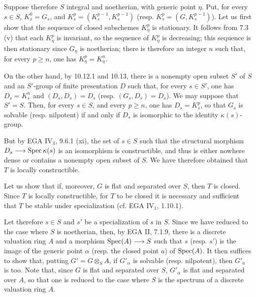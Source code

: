 Suppose therefore $S$ integral and noetherian, with generic point $\eta$. Put, for every $s\in S$, $K_s^0=G_s$, and $K_s^p=(K_s^{p-1},K_s^{p-1})$ (resp. $K_s^p=(G,K_s^{p-1})$). Let us first show that the sequence of closed subschemes $K_\eta^p$ is stationary. It follows from 7.3 (v) that each $K_\eta^p$ is invariant, so the sequence of $K_\eta^p$ is decreasing; this sequence is then stationary since $G_\eta$ is noetherian; there is therefore an integer $n$ such that, for every $p\geq n$, one has $K_\eta^p=K_\eta^n$.

On the other hand, by 10.12.1 and 10.13, there is a nonempty open subset $S'$ of $S$ and an $S'$-group of finite presentation $D$ such that, for every $s\in S'$, one has $D_s=K_s^n$ and $(D_s,D_s)=D_s$ (resp. $(G_s,D_s)=D_s$). We may suppose that $S'=S$. Then, for every $s\in S$, and every $p\geq n$, one has $D_s=K_s^p$, so that $G_s$ is solvable (resp. nilpotent) if and only if $D_s$ is isomorphic to the identity $\kappa(s)$-group.

But by EGA IV$_3$, 9.6.1 (xi), the set of $s\in S$ such that the structural morphism $D_s\longrightarrow\operatorname{Spec}\kappa(s)$ is an isomorphism is constructible, and thus is either nowhere dense or contains a nonempty open subset of $S$. We have therefore obtained that $T$ is locally constructible.

Let us show that if, moreover, $G$ is flat and separated over $S$, then $T$ is closed. Since $T$ is locally constructible, for $T$ to be closed it is necessary and sufficient that $T$ be stable under specialization (cf. EGA IV$_1$, 1.10.1).

Let therefore $s\in S$ and $s'$ be a specialization of $s$ in $S$. Since we have reduced to the case where $S$ is noetherian, then, by EGA II, 7.1.9, there is a discrete valuation ring $A$ and a morphism $\operatorname{Spec}(A)\longrightarrow S$ such that $s$ (resp. $s'$) is the image of the generic point $\alpha$ (resp. the closed point $a$) of $\operatorname{Spec}(A)$. It then suffices to show that, putting $G'=G\otimes_S A$, if $G'_\alpha$ is solvable (resp. nilpotent), then $G'_a$ is too. Note that, since $G$ is flat and separated over $S$, $G'_\alpha$ is flat and separated over $A$, so that one is reduced to the case where $S$ is the spectrum of a discrete valuation ring $A$.

